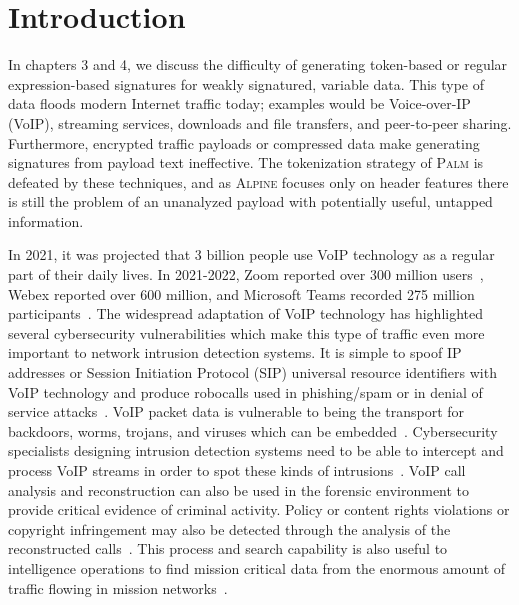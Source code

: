 \section{Introduction}

In chapters 3 and 4, we discuss the difficulty of generating token-based or regular expression-based signatures for weakly signatured, variable data. This type of data floods modern Internet traffic today; examples would be Voice-over-IP (VoIP), streaming services, downloads and file transfers, and peer-to-peer sharing. Furthermore, encrypted traffic payloads or compressed data make generating signatures from payload text ineffective. The tokenization strategy of \textsc{Palm} is defeated by these techniques, and as \textsc{Alpine} focuses only on header features there is still the problem of an unanalyzed payload with potentially useful, untapped information.

In 2021, it was projected that 3 billion people use VoIP technology as a regular part of their daily lives. In 2021-2022, Zoom reported over 300 million users~\cite{teamstage}, Webex reported over 600 million, and Microsoft Teams recorded 275 million participants~\cite{businessofapps}. The widespread adaptation of VoIP technology has highlighted several cybersecurity vulnerabilities which make this type of traffic even more important to network intrusion detection systems. It is simple to spoof IP addresses or Session Initiation Protocol (SIP) universal resource identifiers with VoIP technology and produce robocalls used in phishing/spam or in denial of service attacks~\cite{edwards2020robocalling}. VoIP packet data is vulnerable to being the transport for backdoors, worms, trojans, and viruses which can be embedded~\cite{Wu2021SteganographyAS, nagaraja2019voiploc}. Cybersecurity specialists designing intrusion detection systems need to be able to intercept and process VoIP streams in order to spot these kinds of intrusions~\cite{choti2021prediction}. VoIP call analysis and reconstruction can also be used in the forensic environment to provide critical evidence of criminal activity. Policy or content rights violations or copyright infringement may also be detected through the analysis of the reconstructed calls~\cite{kmetfast, Sha2016VoIPFA}. This process and search capability is also useful to intelligence operations to find mission critical data from the enormous amount of traffic flowing in mission networks~\cite{kao2020forensic}.


